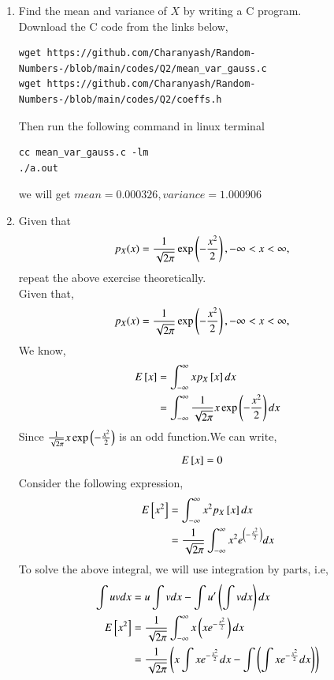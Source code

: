 \documentclass[journal,12pt,twocolumn]{IEEEtran}
\renewcommand\thesection{\arabic{section}}
\begin{document}
\begin{enumerate}[label=\thesection.\arabic*
,ref=\thesection.\theenumi]
\item Find the mean and variance of $X$ by writing a C program.\\
\solution Download the C code from the links below,
\begin{lstlisting}
wget https://github.com/Charanyash/Random-Numbers-/blob/main/codes/Q2/mean_var_gauss.c
wget https://github.com/Charanyash/Random-Numbers-/blob/main/codes/Q2/coeffs.h
\end{lstlisting}
Then run the following command in linux terminal
\begin{lstlisting}
cc mean_var_gauss.c -lm
./a.out
\end{lstlisting}
we will get $mean = 0.000326, variance = 1.000906$
\item Given that 
\begin{align}
p_{X}(x) &= \frac{1}{\sqrt{2\pi}}\exp\left(-\frac{x^2}{2}\right), -\infty < x < \infty,
\end{align}
repeat the above exercise theoretically.\\
\solution Given that,
 \begin{align}
p_{X}(x) &= \frac{1}{\sqrt{2\pi}}\exp\left(-\frac{x^2}{2}\right), -\infty < x < \infty,
 \end{align} 
 We know,
   \begin{align}
	   E{}\left[x\right] &= \int_{-\infty}^{\infty}xp_{X}{}\left[x\right]dx\\
	              &= \int_{-\infty}^{\infty}\frac{1}{\sqrt{2\pi}}x\exp\left(-\frac{x^2}{2}\right)dx
   \end{align}
 Since $\frac{1}{\sqrt{2\pi}}x\exp\left(-\frac{x^2}{2}\right)$ is an odd function.We can write,
   \begin{align}
	   E{}\left[x\right] &= 0 \label{eq:2-3}
   \end{align}
 Consider the following expression,
   \begin{align}
	   E{}\left[x^{2}\right] &= \int_{-\infty}^{\infty}x^{2}p_{X}{}\left[x\right]dx\\
	                  &=\frac{1}{\sqrt{2\pi}}\int_{-\infty}^{\infty}x^{2}e^{\left(-\frac{x^2}{2}\right)}dx
   \end{align}
To solve the above integral, we will use integration by parts, i.e,\\
  \begin{align}
	  \int uvdx &= u\int vdx -\int u'\brak{\int vdx}dx  \\
	  E\sbrak{x^{2}} &= \frac{1}{\sqrt{2\pi}}\int_{-\infty}^{\infty}x\brak{xe^{-\frac{x^2}{2}}}dx\\
			         &= \frac{1}{\sqrt{2\pi}}\brak{x\int x e^{-\frac{x^2}{2}}dx -  \int\brak{\int xe^{-\frac{x^2}{2}}dx}}

\end{align}
\end{enumerate}
\end{document}
